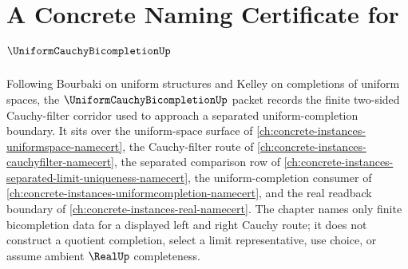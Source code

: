 \chapter{A Concrete Naming Certificate for $\UniformCauchyBicompletionUp$}
\label{ch:concrete-instances-uniform-cauchy-bicompletion-namecert}

Following Bourbaki on uniform structures and Kelley on completions of uniform spaces, the $\UniformCauchyBicompletionUp$ packet records the finite two-sided Cauchy-filter corridor used to approach a separated uniform-completion boundary. It sits over the uniform-space surface of \autoref{ch:concrete-instances-uniformspace-namecert}, the Cauchy-filter route of \autoref{ch:concrete-instances-cauchyfilter-namecert}, the separated comparison row of \autoref{ch:concrete-instances-separated-limit-uniqueness-namecert}, the uniform-completion consumer of \autoref{ch:concrete-instances-uniformcompletion-namecert}, and the real readback boundary of \autoref{ch:concrete-instances-real-namecert}. The chapter names only finite bicompletion data for a displayed left and right Cauchy route; it does not construct a quotient completion, select a limit representative, use choice, or assume ambient $\RealUp$ completeness.


